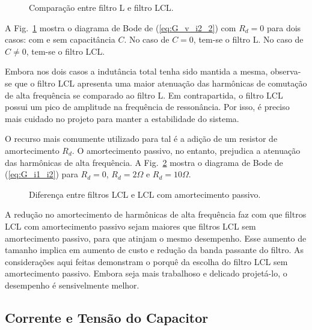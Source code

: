     \begin{figure}[htb]
        \centering{
        	\newlength\figureheight
		    \newlength\figurewidth
            }
        \caption{Comparação entre filtro L e filtro LCL.}
        \label{fig:L_vs_LCL}
    \end{figure}

    A Fig.~\ref{fig:L_vs_LCL} mostra o diagrama de Bode de (\ref{eq:G_v_i2_2})
    com $R_d = 0$ para dois casos: com e sem capacitância $C$. No caso de $C = 0$,
    tem-se o filtro L. No caso de $C \neq 0$, tem-se o filtro LCL.

    Embora nos dois casos a indutância total tenha sido mantida a mesma, observa-se
    que o filtro LCL apresenta uma maior atenuação das harmônicas de comutação
    de alta frequência se comparado ao filtro L. Em contrapartida, o filtro LCL
    possui um pico de amplitude na frequência de ressonância. Por isso, é preciso
    mais cuidado no projeto para manter a estabilidade do sistema.

    O recurso mais comumente utilizado para tal é a adição de um resistor de
    amortecimento $R_d$. O amortecimento passivo, no entanto, prejudica a atenuação
    das harmônicas de alta frequência. A Fig.~\ref{fig:R_in_LCL} mostra o diagrama
    de Bode de (\ref{eq:G_i1_i2}) para $R_d = 0$, $R_d = 2\Omega$ e $R_d = 10\Omega$.

    \begin{figure}[htb]
        \centering{
            }
        \caption{Diferença entre filtros LCL e LCL com amortecimento passivo.}
        \label{fig:R_in_LCL}
    \end{figure}

    A redução no amortecimento de harmônicas de alta frequência faz com que filtros
    LCL com amortecimento passivo sejam maiores que filtros LCL sem amortecimento
    passivo, para que atinjam o mesmo desempenho. Esse aumento de tamanho implica
    em aumento de custo e redução da banda passante do filtro. As considerações
    aqui feitas demonstram o porquê da escolha do filtro LCL sem
    amortecimento passivo. Embora seja mais trabalhoso e delicado projetá-lo,
    o desempenho é sensivelmente melhor.


\subsection{Corrente e Tensão do Capacitor}

